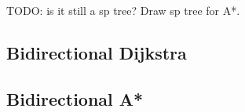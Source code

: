 
{
TODO: is it still a sp tree?
        Draw sp tree for A*.
}


\subsection{Bidirectional Dijkstra}
\subsection{Bidirectional A*}
